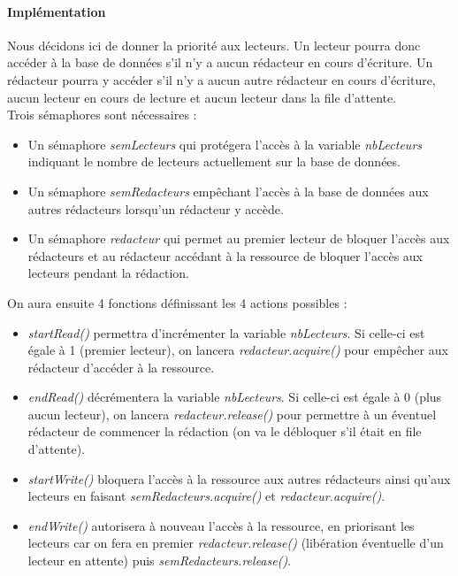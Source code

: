 \documentclass[12pt]{article}
\begin{document}
  \paragraph{Implémentation\\}
  Nous décidons ici de donner la priorité aux lecteurs. Un lecteur pourra donc accéder à la base de données s'il n'y a aucun rédacteur en cours d'écriture. Un rédacteur pourra y accéder s'il n'y a aucun autre rédacteur en cours d'écriture, aucun lecteur en cours de lecture et aucun lecteur dans la file d'attente. \\
  Trois sémaphores sont nécessaires :
  \begin{itemize}
    \item Un sémaphore \textit{semLecteurs} qui protégera l'accès à la variable \textit{nbLecteurs} indiquant le nombre de lecteurs actuellement sur la base de données.
    \item Un sémaphore \textit{semRedacteurs} empêchant l'accès à la base de données aux autres rédacteurs lorsqu'un rédacteur y accède.
    \item Un sémaphore \textit{redacteur} qui permet au premier lecteur de bloquer l'accès aux rédacteurs et au rédacteur accédant à la ressource de bloquer l'accès aux lecteurs pendant la rédaction.
  \end{itemize}
  On aura ensuite 4 fonctions définissant les 4 actions possibles :
  \begin{itemize}
    \item \textit{startRead()} permettra d'incrémenter la variable \textit{nbLecteurs}. Si celle-ci est égale à 1 (premier lecteur), on lancera \textit{redacteur.acquire()} pour empêcher aux rédacteur d'accéder à la ressource.
    \item \textit{endRead()} décrémentera la variable \textit{nbLecteurs}. Si celle-ci est égale à 0 (plus aucun lecteur), on lancera \textit{redacteur.release()} pour permettre à un éventuel rédacteur de commencer la rédaction (on va le débloquer s'il était en file d'attente).
    \item \textit{startWrite()} bloquera l'accès à la ressource aux autres rédacteurs ainsi qu'aux lecteurs en faisant \textit{semRedacteurs.acquire()} et \textit{redacteur.acquire()}.
    \item \textit{endWrite()} autorisera à nouveau l'accès à la ressource, en priorisant les lecteurs car on fera en premier \textit{redacteur.release()} (libération éventuelle d'un lecteur en attente) puis \textit{semRedacteurs.release()}.
  \end{itemize}
\end{document}
